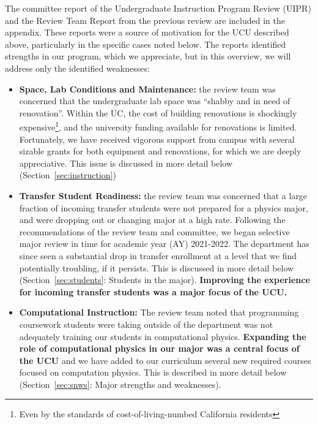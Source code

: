 \documentclass[12pt]{article}
\begin{document}
\noindent
The committee report of the Undergraduate Instruction Program Review
(UIPR) and the Review Team Report from the previous review are
included in the appendix.  These reports were a source of motivation
for the UCU described above, particularly in the specific cases noted
below.  The reports identified strengths in our program, which we
appreciate, but in this overview, we will address only the identified
weaknesses:
\begin{itemize}

\item {\bf Space, Lab Conditions and Maintenance:} the review team was
  concerned that the undergraduate lab space was ``shabby and in need
  of renovation''.  Within the UC, the cost of building renovations is
  shockingly expensive\footnote{Even by the standards of
    cost-of-living-numbed California residents}, and the university
  funding available for renovations is limited.  Fortunately, we have
  received vigorous support from campus with several sizable grants
  for both equipment and renovations, for which we are deeply
  appreciative.  This issue is discussed in more detail below (Section~\ref{sec:instruction})
  
\item {\bf Transfer Student Readiness:} the review team was concerned
  that a large fraction of incoming transfer students were not
  prepared for a physics major, and were dropping out or changing
  major at a high rate.  Following the recommendations of the review
  team and committee, we began selective major review in time for
  academic year (AY) 2021-2022.  The department has since seen a
  substantial drop in transfer enrollment at a level that we find
  potentially troubling, if it persists.  This is discussed in more
  detail below (Section~\ref{sec:students}: Students in the major).
  {\bf Improving the experience for incoming transfer students was a major
  focus of the UCU.}

\item {\bf Computational Instruction:} The review team noted that
  programming coursework students were taking outside of the
  department was not adequately training our students in computational
  physics.  {\bf Expanding the role of computational physics in our
    major was a central focus of the UCU} and we have added to our
  curriculum several new required courses focused on computation
  physics.  This is described in more detail below
  (Section~\ref{sec:snws}: Major strengths and weaknesses).
  

\end{itemize}
\end{document}
